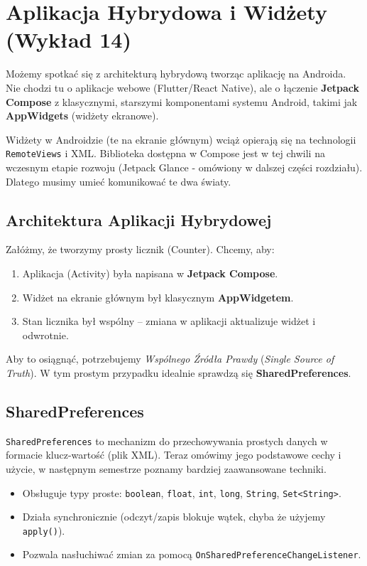 \chapter{Aplikacja Hybrydowa i Widżety (Wykład 14)}

Możemy spotkać się z architekturą hybrydową tworząc aplikację na Androida. Nie chodzi tu o aplikacje webowe (Flutter/React Native), ale o łączenie \textbf{Jetpack Compose} z klasycznymi, starszymi komponentami systemu Android, takimi jak \textbf{AppWidgets} (widżety ekranowe).

Widżety w Androidzie (te na ekranie głównym) wciąż opierają się na technologii \texttt{RemoteViews} i XML. Biblioteka dostępna w Compose jest w tej chwili na wczesnym etapie rozwoju (Jetpack Glance - omówiony w dalszej części rozdziału). Dlatego musimy umieć komunikować te dwa światy.

\section{Architektura Aplikacji Hybrydowej}

Załóżmy, że tworzymy prosty licznik (Counter). Chcemy, aby:
\begin{enumerate}
    \item Aplikacja (Activity) była napisana w \textbf{Jetpack Compose}.
    \item Widżet na ekranie głównym był klasycznym \textbf{AppWidgetem}.
    \item Stan licznika był wspólny – zmiana w aplikacji aktualizuje widżet i odwrotnie.
\end{enumerate}

Aby to osiągnąć, potrzebujemy \textit{Wspólnego Źródła Prawdy} (\textit{Single Source of Truth}). W tym prostym przypadku idealnie sprawdzą się \textbf{SharedPreferences}.

\section{SharedPreferences}

\texttt{SharedPreferences} to mechanizm do przechowywania prostych danych w formacie klucz-wartość (plik XML). Teraz omówimy jego podstawowe cechy i użycie, w następnym semestrze poznamy bardziej zaawansowane techniki.

\begin{itemize}
    \item Obsługuje typy proste: \texttt{boolean}, \texttt{float}, \texttt{int}, \texttt{long}, \texttt{String}, \texttt{Set<String>}.
    \item Działa synchronicznie (odczyt/zapis blokuje wątek, chyba że użyjemy \texttt{apply()}).
    \item Pozwala nasłuchiwać zmian za pomocą \texttt{OnSharedPreferenceChangeListener}.
\end{itemize}


